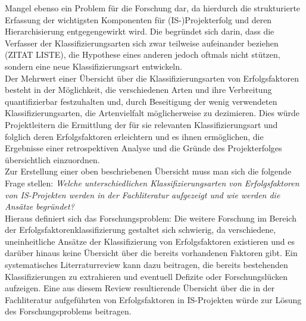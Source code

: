 Mangel ebenso ein Problem für die Forschung dar, da hierdurch die strukturierte Erfassung der wichtigsten 
Komponenten für (IS-)Projekterfolg und deren Hierarchisierung entgegengewirkt wird. Die begründet sich 
darin, dass die Verfasser der Klassifizierungsarten sich zwar teilweise aufeinander beziehen (ZITAT LISTE), die 
Hypothese eines anderen jedoch oftmals nicht stützen, sondern eine neue Klassifizierungsart entwickeln.\\\noindent
Der Mehrwert einer Übersicht über die Klassifizierungsarten von Erfolgsfaktoren besteht in der Möglichkeit, 
die verschiedenen Arten und ihre Verbreitung quantifizierbar festzuhalten und, durch Beseitigung der wenig verwendeten 
Klassifizierungsarten, die Artenvielfalt möglicherweise zu dezimieren. Dies würde Projektleitern die Ermittlung der für 
sie relevanten Klassifizierungsart und folglich deren Erfolgsfaktoren erleichtern und es ihnen ermöglichen, die Ergebnisse einer 
retrospektiven Analyse und die Gründe des Projekterfolges übersichtlich einzuordnen.
\\Zur Erstellung einer oben beschriebenen Übersicht muss man sich die folgende Frage stellen:
\textit{Welche unterschiedlichen Klassifizierungsarten von Erfolgsfaktoren von IS-Projekten werden in der Fachliteratur aufgezeigt und wie werden die Ansätze begründet?}\\
Hieraus definiert sich das Forschungsproblem:
Die weitere Forschung im Bereich der Erfolgsfaktorenklassifizierung gestaltet sich schwierig, da
verschiedene, uneinheitliche Ansätze der Klassifizierung von Erfolgsfaktoren existieren und es darüber hinaus keine Übersicht über die bereits vorhandenen Faktoren gibt.
Ein systematisches Literraturreview kann dazu beitragen, die bereits bestehenden Klassifizierungen zu extrahieren 
und eventuell Defizite oder Forschungslücken aufzeigen.
Eine aus diesem Review resultierende Übersicht über die in der Fachliteratur aufgeführten \KAS von 
Erfolgsfaktoren in IS-Projekten würde zur Lösung des Forschungsproblems beitragen.